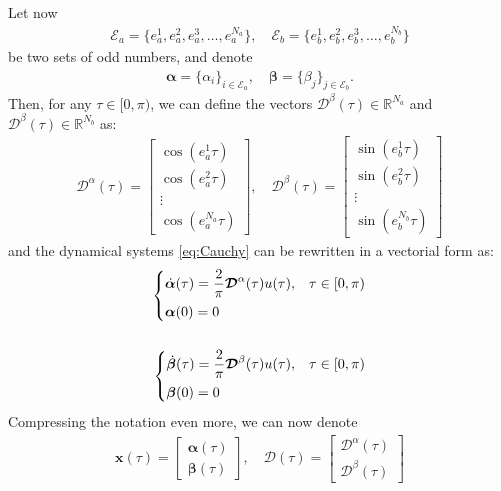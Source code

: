 Let now
\begin{align*}
	\mathcal{E}_a = \{e_a^1,e_a^2,e_a^3,\dots,e_a^{N_a}\}, \quad \mathcal{E}_b = \{e_b^1,e_b^2,e_b^3,\dots,e_b^{N_b}\}    
\end{align*}
be two sets of odd numbers, and denote
\begin{align*}
	\bm{\alpha} = \{\alpha_i\}_{i\in\mathcal{E}_a}, \quad \bm{\beta} = \{\beta_j\}_{j\in\mathcal{E}_b}.
\end{align*}
Then, for any $\tau\in [0,\pi)$, we can define the vectors $\bm{\mathcal{D}}^\beta(\tau) \in \mathbb{R}^{N_a} $ and $ \bm{\mathcal{D}}^\beta(\tau) \in \mathbb{R}^{N_b}$ as:
\begin{align*}
	\bm{\mathcal{D}}^\alpha(\tau) = 
	\begin{bmatrix} 
		\cos(e_a^1\tau) \\ \cos(e_a^2\tau) \\ \vdots \\ \cos(e_a^{N_a}\tau) 
	\end{bmatrix},
	\quad \bm{\mathcal{D}}^\beta(\tau) = 
	\begin{bmatrix} 
		\sin(e_b^1\tau) \\ \sin(e_b^2\tau) \\ \vdots \\ \sin(e_b^{N_b}\tau) 
	\end{bmatrix} 
\end{align*}
and the dynamical systems \eqref{eq:Cauchy} can be rewritten in a vectorial form as:
\begin{align}\label{eq:CauchyVec}
	\begin{cases}
		\displaystyle \dot{\bm{\alpha}}(\tau) = \frac 2\pi \bm{\mathcal{D}}^\alpha(\tau) u(\tau), & \tau \in [0,\pi)
		\\[6pt]
		\bm{\alpha}(0) = 0
	\end{cases} \notag
	\\
	\\
	\begin{cases}
		\displaystyle\dot{\bm{\beta}}(\tau)  = \frac 2\pi \bm{\mathcal{D}}^\beta(\tau) u(\tau), & \tau \in [0,\pi) 
		\\[6pt]
		\bm{\beta}(0) = 0
	\end{cases}\notag 
\end{align}
Compressing the notation even more, we can now denote 
\begin{align*}
	\bm{x}(\tau) = \begin{bmatrix} \bm{\alpha}(\tau) \\ \bm{\beta}(\tau) \end{bmatrix}, \quad
	\bm{\mathcal{D}}(\tau) = \begin{bmatrix} \bm{\mathcal{D}}^\alpha(\tau) \\ \bm{\mathcal{D}}^\beta(\tau) \end{bmatrix}     
\end{align*}
